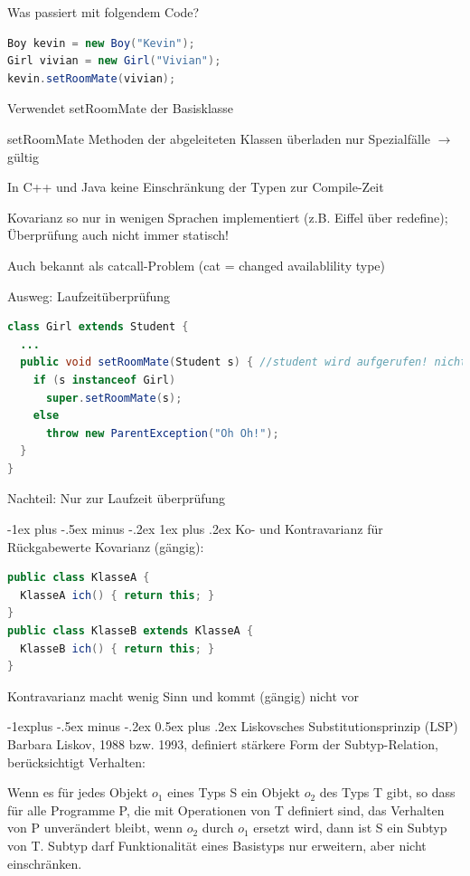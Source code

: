 \documentclass[10pt]{article}
\makeatletter
\renewcommand{\subsection}{\@startsection{subsection}{2}{0mm}%
                                {-1explus -.5ex minus -.2ex}%
                                {0.5ex plus .2ex}%
                                {\normalfont\normalsize\bfseries}}
\renewcommand{\subsubsection}{\@startsection{subsubsection}{3}{0mm}%
                                {-1ex plus -.5ex minus -.2ex}%
                                {1ex plus .2ex}%
                                {\normalfont\small\bfseries}}
\makeatother
\begin{document}
Was passiert mit folgendem Code?
\begin{lstlisting}[language=java]
Boy kevin = new Boy("Kevin");
Girl vivian = new Girl("Vivian");
kevin.setRoomMate(vivian);
\end{lstlisting}

\begin{itemize*}
  \item Verwendet setRoomMate der Basisklasse
  \item setRoomMate Methoden der abgeleiteten Klassen überladen nur Spezialfälle $\rightarrow$ gültig
  \item In C++ und Java keine Einschränkung der Typen zur Compile-Zeit
  \item Kovarianz so nur in wenigen Sprachen implementiert (z.B. Eiffel über redefine); Überprüfung auch nicht immer statisch!
  \item Auch bekannt als catcall-Problem (cat = changed availablility type)
\end{itemize*}
Ausweg: Laufzeitüberprüfung
\begin{lstlisting}[language=java]
class Girl extends Student {
  ...
  public void setRoomMate(Student s) { //student wird aufgerufen! nicht boy oder girl, dadurch koennen die methoden der klasse verwendet werden
    if (s instanceof Girl)
      super.setRoomMate(s);
    else
      throw new ParentException("Oh Oh!");
  }
}
\end{lstlisting}
Nachteil: Nur zur Laufzeit überprüfung

\subsubsection{Ko- und Kontravarianz für Rückgabewerte}
Kovarianz (gängig):
\begin{lstlisting}[language=java]
public class KlasseA {
  KlasseA ich() { return this; }
}
public class KlasseB extends KlasseA {
  KlasseB ich() { return this; }
}
\end{lstlisting}

Kontravarianz macht wenig Sinn und kommt (gängig) nicht vor

\subsection{Liskovsches Substitutionsprinzip (LSP)}
Barbara Liskov, 1988 bzw. 1993, definiert stärkere Form der Subtyp-Relation, berücksichtigt Verhalten:

Wenn es für jedes Objekt $o_1$ eines Typs S ein Objekt $o_2$ des Typs T gibt, so dass für alle Programme P, die mit Operationen von T definiert sind, das Verhalten von P unverändert bleibt, wenn $o_2$ durch $o_1$ ersetzt wird, dann ist S ein Subtyp von T.
Subtyp darf Funktionalität eines Basistyps nur erweitern, aber nicht einschränken.
\end{document}
